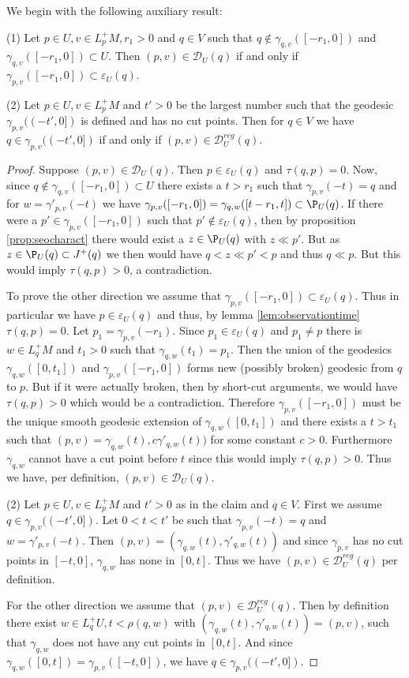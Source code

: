 We begin with the following auxiliary result:
\begin{lemma}\label{lem:aux}
(1) Let $p\in U, v\in L^+_pM, r_1>0$ and $q\in V$ such that $q\notin \gamma_{q,v}([-r_1,0])$ and $\gamma_{q,v}([-r_1,0])\subset U$. Then $(p,v)\in \mathcal{D}_U(q)$ if and only if $\gamma_{p,v}([-r_1,0])\subset \varepsilon_U(q)$.

(2) Let $p\in U, v\in L^+_pM$ and $t'>0$ be the largest number such that the geodesic $\gamma_{p,v}((-t',0])$ is defined and has no cut points. Then for $q\in V$ we have $q\in \gamma_{p,v}((-t',0])$ if and only if $(p,v) \in \mathcal{D}^{reg}_U(q)$.
\end{lemma}
\begin{proof}
Suppose $(p,v)\in \mathcal{D}_U(q)$. Then $p\in \varepsilon_U(q)$ and $\tau(q,p)=0$. Now, since $q\notin \gamma_{q,v}([-r_1,0])\subset U$ there exists a $t>r_1$ such that $\gamma_{p,v}(-t) = q$ and for $w = \gamma'_{p,v}(-t)$ we have $\gamma_{p,v}([-r_1,0]) = \gamma_{q,w}([t-r_1,t])\subset \P_U(q)$. If there were a $p'\in \gamma_{p,v}([-r_1,0])$ such that $p'\notin \varepsilon_U(q)$, then by proposition \ref{prop:seocharact} there would exist a $z\in \P_U(q)$ with $z\ll p'$. But as $z\in \P_U(q)\subset J^+(q)$ we then would have $q<z\ll p'<p$ and thus $q\ll p$. But this would imply $\tau(q,p)>0$, a contradiction.

To prove the other direction we assume that $\gamma_{p,v}([-r_1,0])\subset \varepsilon_U(q)$. Thus in particular we have $p\in\varepsilon_U(q)$ and thus, by lemma \ref{lem:observationtime} $\tau(q,p)=0$. Let $p_1=\gamma_{p,v}(-r_1)$. Since $p_1\in \varepsilon_U(q)$ and $p_1\neq p$ there is $w\in L^+_qM$ and $t_1>0$ such that $\gamma_{q,w}(t_1) = p_1$. Then the union of the geodesics $\gamma_{q,w}([0,t_1])$ and $\gamma_{p,v}([-r_1,0])$ forms new (possibly broken) geodesic from $q$ to $p$. But if it were actually broken, then by short-cut arguments, we would have $\tau(q,p)>0$ which would be a contradiction. Therefore $\gamma_{p,v}([-r_1,0])$ must be the unique smooth geodesic extension of $\gamma_{q,w}([0,t_1])$ and there exists a $t>t_1$ such that $(p,v) = \gamma_{q,w}(t), c\gamma'_{q,w}(t))$ for some constant $c>0$. Furthermore $\gamma_{q,w}$ cannot have a cut point before $t$ since this would imply $\tau(q,p)>0$. Thus we have, per definition, $(p,v)\in \mathcal{D}_U(q)$.

(2) Let $p\in U, v\in L^+_pM$ and $t'>0$ as in the claim and $q\in V$. 
First we assume $q\in \gamma_{p,v}((-t',0])$. Let $0<t<t'$ be such that $\gamma_{p,v}(-t)=q$ and $w=\gamma'_{p,v}(-t)$. Then $(p,v) = (\gamma_{q,w}(t),\gamma'_{q,w}(t))$ and since $\gamma_{p,v}$ has no cut points in $[-t,0]$, $\gamma_{q,w}$ has none in $[0,t]$. Thus we have $(p,v)\in \mathcal{D}^{reg}_U(q)$ per definition.

For the other direction we assume that $(p,v) \in \mathcal{D}^{reg}_U(q)$. Then by definition there exist $w\in L^+_qU, t<\rho(q,w)$ with $(\gamma_{q,w}(t),\gamma'_{q,w}(t)) = (p,v)$, such that $\gamma_{q,w}$ does not have any cut points in $[0,t]$. And since $\gamma_{q,w}([0,t])=\gamma_{p,v}([-t,0])$, we have $q\in \gamma_{p,v}((-t',0])$.
\end{proof}

